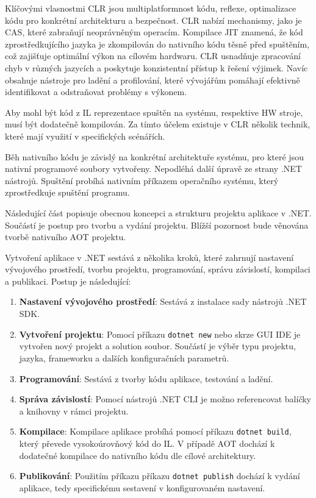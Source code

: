 Klíčovými vlasnostmi CLR jsou multiplatformnost kódu, reflexe, optimalizace kódu pro konkrétní architekturu a bezpečnost. CLR nabízí mechanismy, jako je CAS, které zabraňují neoprávněným operacím. Kompilace JIT znamená, že kód zprostředkujícího jazyka je zkompilován do nativního kódu těsně před spuštěním, což zajišťuje optimální výkon na cílovém hardwaru. CLR usnadňuje zpracování chyb v různých jazycích a poskytuje konzistentní přístup k řešení výjimek. Navíc obsahuje nástroje pro ladění a profilování, které vývojářům pomáhají efektivně identifikovat a odstraňovat problémy s výkonem.

Aby mohl být kód z IL reprezentace spuštěn na systému, respektive HW stroje, musí být dodatečně kompilován. Za tímto účelem existuje v CLR několik technik, které mají využití v specifických scénářích.


Běh nativního kódu je závislý na konkrétní architektuře systému, pro které jsou nativní programové soubory vytvořeny. Nepodléhá další úpravě ze strany .NET nástrojů. Spuštění probíhá nativním příkazem operačního systému, který zprostředkuje spuštění programu.


Následující část popisuje obecnou koncepci a strukturu projektu aplikace v .NET. Součástí je postup pro tvorbu a vydání projektu. Blížší pozornost bude věnována tvorbě nativního AOT projektu.


Vytvoření aplikace v .NET sestává z několika kroků, které zahrnují nastavení vývojového prostředí, tvorbu projektu, programování, správu závislostí, kompilaci a publikaci. Postup je následující:

\begin{enumerate}
    \item \textbf{Nastavení vývojového prostředí}: Sestává z instalace sady nástrojů .NET SDK.
    
    \item \textbf{Vytvoření projektu}: Pomocí příkazu \texttt{dotnet new} nebo skrze GUI IDE je vytvořen nový projekt a solution soubor. Součástí je výběr typu projektu, jazyka, frameworku a dalších konfiguračních parametrů.
    
    \item \textbf{Programování}: Sestává z tvorby kódu aplikace, testování a ladění.

    \item \textbf{Správa závislostí}: Pomocí nástrojů .NET CLI je možno referencovat balíčky a knihovny v rámci projektu.
    
    \item \textbf{Kompilace}: Kompilace aplikace probíhá pomocí příkazu \texttt{dotnet build}, který převede vysokoúrovňový kód do IL. V případě AOT dochází k dodatečné kompilace do nativního kódu dle cílové architektury.
    
    \item \textbf{Publikování}: Použitím příkazu příkazu \texttt{dotnet publish} dochází k vydání aplikace, tedy specifickému sestavení v konfigurovaném nastavení.
\end{enumerate}

